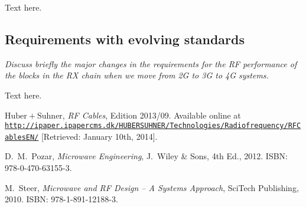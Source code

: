 \documentclass[a4paper, 12pt]{article}
\newlength{\oneLine}
\newlength{\halfLine}
\begin{document}
\vspace*{\halfLine}
\noindent
Text here.


\subsection{Requirements with evolving standards}

\textit{Discuss briefly the major changes in the requirements for the 
RF performance of the blocks in the RX chain when we move from 2G to 
3G to 4G systems.}

\vspace*{\oneLine}
\noindent
Text here.


\begin{thebibliography}{9}%

 $\mathrm{Huber}+\mathrm{Suhner}$, 
	\textit{RF Cables}, 
	Edition 2013/09. 
	Available online at \href{http://ipaper.ipapercms.dk/HUBERSUHNER/Technologies/Radiofrequency/RFCablesEN/}
		{\texttt{http://ipaper.\linebreak{}ipapercms.dk/HUBERSUHNER/Technologies/Radiofrequency/RFCablesEN/}}
	[Retrieved: January 10th, 2014].


 D.\ M.\ Pozar, 
	\textit{Microwave Engineering}, 
	J.\ Wiley \& Sons, 4th Ed., 2012. 
	ISBN: 978-0-470-63155-3.
	

 M.\ Steer, 
	\textit{Microwave and RF Design -- A Systems Approach}, 
	SciTech Publishing, 2010. 
	ISBN: 978-1-891-12188-3.
	
	

\end{thebibliography}
\end{document}
